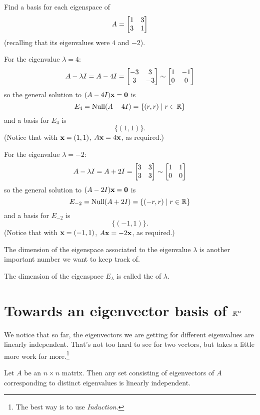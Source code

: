 \begin{myprob} Find a basis for each eigenspace of 
$$
A = \left[ \begin{matrix} 1 & 3 \\ 3 & 1 \end{matrix} \right]
$$
(recalling that its eigenvalues were $4$ and $-2$).

\begin{mysol}
For the eigenvalue $\lambda = 4$:
$$
A-\lambda I = A-4I = \left[ \begin{matrix} -3&3\\3&-3 \end{matrix} \right] \sim \left[ \begin{matrix} 1 & -1\\0&0 \end{matrix} \right]
$$
so the general solution to $(A-4I)\mathbf{x} = \mathbf{0}$ is
$$
E_4 = \operatorname{Null}(A-4I) = \{(r,r) \mid r\in\mathbb{R}\}
$$
and a basis for $E_4$ is
$$
\{ (1,1) \}.
$$
(Notice that with $\mathbf{x} = (1,1)$, $A\mathbf{x} = 4\mathbf{x}$, as required.)


For the eigenvalue $\lambda = -2$:
$$
 A-\lambda I = A+2I = \left[ \begin{matrix} 3&3\\3&3 \end{matrix} \right] \sim \left[ \begin{matrix} 1&1\\0&0 \end{matrix} \right]
$$
so the general solution to $(A-2I)\mathbf{x} = \mathbf{0}$ is
$$
E_{-2} = \operatorname{Null}(A+2I) = \{(-r,r) \mid r\in\mathbb{R}\}
$$
and a basis for $E_{-2}$ is
$$
\{ (-1,1) \}.
$$
(Notice that with $\mathbf{x} = (-1,1)$, $A\mathbf{x} = -2\mathbf{x}$, as required.)
\end{mysol}\end{myprob}

The dimension of the eigenspace associated to the eigenvalue $\lambda$ is another important number we want to keep track of.

\begin{definition}
The dimension of the eigenspace $E_\lambda$ is called the
 of $\lambda$.
\end{definition}

\section{Towards an eigenvector basis of $\mathbb{R}^n$}

We notice that so far, the eigenvectors we are getting for 
different eigenvalues are linearly independent.  That's not
too hard to see for two vectors, but takes a little more work for more.\footnote{The best way is to use {\it Induction}.}  

\begin{theorem}
Let $A$ be an $n\times n$ matrix.  Then any set consisting
of eigenvectors of $A$ corresponding to distinct eigenvalues
is linearly independent.
\end{theorem}

